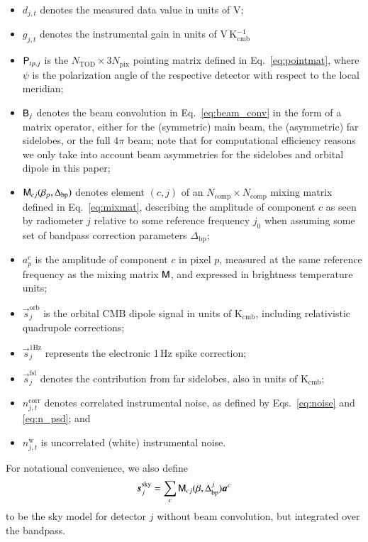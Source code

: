 \documentclass[onecolumn]{aa}
\newcommand{\s}[0]{\vec{s}}
\renewcommand{\a}[0]{\vec{a}}
\newcommand{\B}[0]{\tens{B}}
\newcommand{\M}[0]{\tens{M}}
\renewcommand{\P}[0]{\tens{P}}
\newcommand{\Dbp}[0]{\Delta_{\mathrm{bp}}}
\begin{document}
\begin{itemize}
\item $d_{j,t}$ denotes the measured data value in units of V;
\item $g_{j,t}$ denotes the instrumental gain in units of V\,K$_{\mathrm{cmb}}^{-1}$
\item $\P_{tp,j}$ is the $N_{\mathrm{TOD}}\times 3N_{\mathrm{pix}}$
  pointing matrix defined in Eq.~\eqref{eq:pointmat}, where $\psi$ is
  the polarization angle of the respective detector with respect to
  the local meridian;
\item $\B_{j}$ denotes the beam convolution in
  Eq.~\eqref{eq:beam_conv} in the form of a matrix operator, either
  for the (symmetric) main beam, the (asymmetric) far sidelobes, or
  the full $4\pi$ beam; note that for computational efficiency reasons
  we only take into account beam asymmetries for the sidelobes and
  orbital dipole in this paper;
\item $\M_{cj}(\beta_{p}, \Dbp)$ denotes element $(c,j)$ of an
  $N_{\mathrm{comp}}\times N_{\mathrm{comp}}$ mixing matrix defined in
  Eq.~\eqref{eq:mixmat}, describing the amplitude of component $c$ as
  seen by radiometer $j$ relative to some reference frequency $j_0$
  when assuming some set of bandpass correction parameters $\Dbp$;
\item $a^c_{p}$ is the amplitude of component $c$ in pixel $p$,
  measured at the same reference frequency as the mixing matrix $\M$,
  and expressed in brightness temperature units;
\item $\s^{\mathrm{orb}}_{j}$ is the orbital CMB dipole signal in units
  of K$_{\mathrm{cmb}}$, including relativistic quadrupole
  corrections;
\item $\s^{\mathrm{1Hz}}_{j}$ represents the electronic 1\,Hz spike
  correction;
\item $\s^{\mathrm{fsl}}_{j}$ denotes the contribution from far
  sidelobes, also in units of K$_{\mathrm{cmb}}$;
\item $n^{\mathrm{corr}}_{j,t}$ denotes correlated instrumental noise,
  as defined by Eqs.~\eqref{eq:noise} and \eqref{eq:n_psd}; and
\item $n^{\mathrm{w}}_{j,t}$ is uncorrelated (white) instrumental
  noise.
\end{itemize}
For notational convenience, we also define
\begin{equation}
    \s^{\mathrm{sky}}_{j} = \sum_{c} \M_{cj}(\beta, \Dbp^{j})\a^c
\end{equation}
to be the sky model for detector $j$ without beam convolution, but
integrated over the bandpass.
\end{document}
